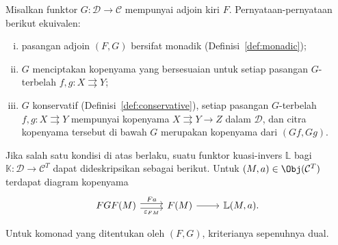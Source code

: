 \begin{theorem}[J.\ M.\ Beck]\label{prop:Beck}
	Misalkan funktor $G:\mathcal{D}\to\mathcal{C}$ mempunyai adjoin kiri $F$.
	Pernyataan-pernyataan berikut ekuivalen:
	\begin{enumerate}[(i)]
		\item pasangan adjoin $(F,G)$ bersifat monadik
		(Definisi~\ref{def:monadic});
		\item $G$ menciptakan kopenyama yang bersesuaian untuk setiap pasangan
		$G$-terbelah $f,g:X\rightrightarrows Y$;
		\item $G$ konservatif (Definisi~\ref{def:conservative}), setiap pasangan
		$G$-terbelah $f,g:X\rightrightarrows Y$ mempunyai kopenyama
		$X\rightrightarrows Y\to Z$ dalam $\mathcal{D}$, dan citra kopenyama
		tersebut di bawah $G$ merupakan kopenyama dari $(Gf,Gg)$.
	\end{enumerate}

	Jika salah satu kondisi di atas berlaku, suatu funktor kuasi-invers
	$\mathbb{L}$ bagi $\mathbb{K}:\mathcal{D}\to\mathcal{C}^T$ dapat
	dideskripsikan sebagai berikut. Untuk $(M,a)\in\Obj(\mathcal{C}^T)$ terdapat
	diagram kopenyama
	\begin{equation}\label{eqn:Beck-aux1}\begin{tikzcd}
		FGF(M) \arrow[shift left, r, "Fa"] \arrow[shift right, r, "\varepsilon_{FM}"'] & F(M) \arrow[r] & \mathbb{L}(M, a).
	\end{tikzcd}\end{equation}

	Untuk komonad yang ditentukan oleh $(F,G)$, kriterianya sepenuhnya dual.
\end{theorem}
